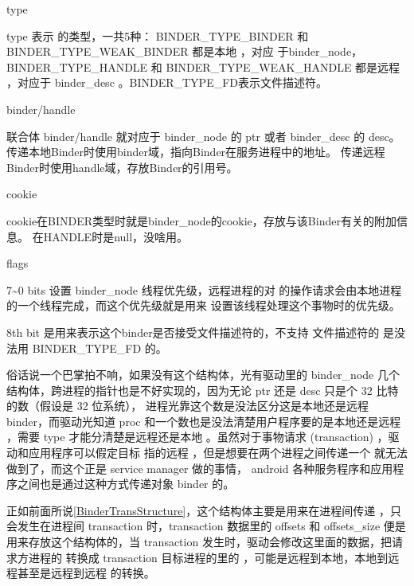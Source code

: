 \documentclass[a4paper,11pt]{article}
\begin{document}
\begin{description*}
    \item [type]
        
        type 表示 \binder 的类型，一共5种：
         BINDER_TYPE_BINDER 和 BINDER_TYPE_WEAK_BINDER 都是本地 \binder，对应
         于binder_node，BINDER_TYPE_HANDLE 和 BINDER_TYPE_WEAK_HANDLE 都是远程
         \binder ，对应于 binder_desc 。BINDER_TYPE_FD表示文件描述符。
    \item [binder/handle]
        
        联合体 binder/handle 就对应于 binder_node 的 ptr 或者 binder_desc 的
        desc。传递本地Binder时使用binder域，指向Binder在服务进程中的地址。
        传递远程Binder时使用handle域，存放Binder的引用号。

    \item [cookie] 
        
        cookie在BINDER类型时就是binder_node的cookie，存放与该Binder有关的附加信息。
        在HANDLE时是null，没啥用。

    \item [flags]
        
            7\~{}0 bits 设置 binder_node 线程优先级，远程进程的对 \binder
            的操作请求会由\binder 本地进程的一个线程完成，而这个优先级就是用来
            设置该线程处理这个\binder 事物时的优先级。

            8th bit 是用来表示这个binder是否接受文件描述符的，不支持
            文件描述符的 \binder 是没法用 BINDER_TYPE_FD 的。
\end{description*}

俗话说一个巴掌拍不响，如果没有这个结构体，光有驱动里的
binder_node 几个结构体，跨进程的指针也是不好实现的，因为无论 ptr 还是 desc
只是个 32 比特的数（假设是 32 位系统），
进程光靠这个数是没法区分这是本地还是远程 binder，而驱动光知道 proc
和一个数也是没法清楚用户程序要的是本地还是远程 \binder，需要 type
才能分清楚是远程还是本地 \binder 。虽然对于事物请求 (transaction)
，驱动和应用程序可以假定目标 \binder 指的远程 \binder
，但是想要在两个进程之间传递一个 \binder 就无法做到了，而这个正是 service manager 做的事情， android
各种服务程序和应用程序之间也是通过这种方式传递对象 binder
的。

正如前面所说\ref{BinderTransStructure}，这个结构体主要是用来在进程间传递 \binder
，只会发生在进程间 transaction 时，transaction 数据里的 offsets 和
offsets_size 便是用来存放这个结构体的，当 transaction
发生时，驱动会修改这里面的数据，把请求方进程的 \binder 转换成 transaction
目标进程的里的 \binder，可能是远程到本地，本地到远程甚至是远程到远程 \binder
的转换。
\end{document}
